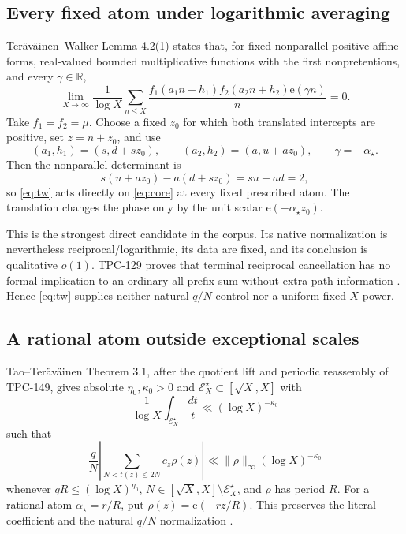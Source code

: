 \documentclass[11pt]{article}
\newcommand{\e}{\mathrm e}
\begin{document}
\subsection{Every fixed atom under logarithmic averaging}

Ter\"av\"ainen--Walker Lemma 4.2(1) states that, for fixed nonparallel
positive affine forms, real-valued bounded multiplicative functions with
the first nonpretentious, and every \(\gamma\in\mathbb R\),
\begin{equation}
 \lim_{X\to\infty}\frac1{\log X}
 \sum_{n\le X}
 \frac{f_1(a_1n+h_1)f_2(a_2n+h_2)\e(\gamma n)}n=0.
\label{eq:tw}
\end{equation}
Take \(f_1=f_2=\mu\).  Choose a fixed \(z_0\) for which both translated
intercepts are positive, set \(z=n+z_0\), and use
\[
 (a_1,h_1)=(s,d+sz_0),\qquad
 (a_2,h_2)=(a,u+az_0),\qquad
 \gamma=-\alpha_\star.
\]
Then the nonparallel determinant is
\[
 s(u+az_0)-a(d+sz_0)=su-ad=2,
\]
so \eqref{eq:tw} acts directly on \eqref{eq:core} at every fixed prescribed
atom.  The translation changes the phase only by the unit scalar
\(\e(-\alpha_\star z_0)\).

This is the strongest direct candidate in the corpus.  Its native
normalization is nevertheless reciprocal/logarithmic, its data are fixed,
and its conclusion is qualitative \(o(1)\).  TPC-129 proves that terminal
reciprocal cancellation has no formal implication to an ordinary
all-prefix sum without extra path information \citep{WangTPC129}.  Hence
\eqref{eq:tw} supplies neither natural \(q/N\) control nor a uniform
fixed-\(X\) power.

\subsection{A rational atom outside exceptional scales}

Tao--Ter\"av\"ainen Theorem 3.1, after the quotient lift and periodic
reassembly of TPC-149, gives absolute \(\eta_0,\kappa_0>0\) and
\(\mathcal E_X^\star\subset[\sqrt X,X]\) with
\[
 \frac1{\log X}\int_{\mathcal E_X^\star}\frac{dt}{t}
 \ll(\log X)^{-\kappa_0}
\]
such that
\begin{equation}
 \frac qN\left|
 \sum_{N<t(z)\le2N}c_z\rho(z)\right|
 \ll\|\rho\|_\infty(\log X)^{-\kappa_0}
\label{eq:tt}
\end{equation}
whenever \(qR\le(\log X)^{\eta_0}\),
\(N\in[\sqrt X,X]\setminus\mathcal E_X^\star\), and \(\rho\) has
period \(R\).  For a rational atom \(\alpha_\star=r/R\), put
\(\rho(z)=\e(-rz/R)\).  This preserves the literal coefficient and the
natural \(q/N\) normalization \citep{WangTPC149,WangTPC158}.
\end{document}
